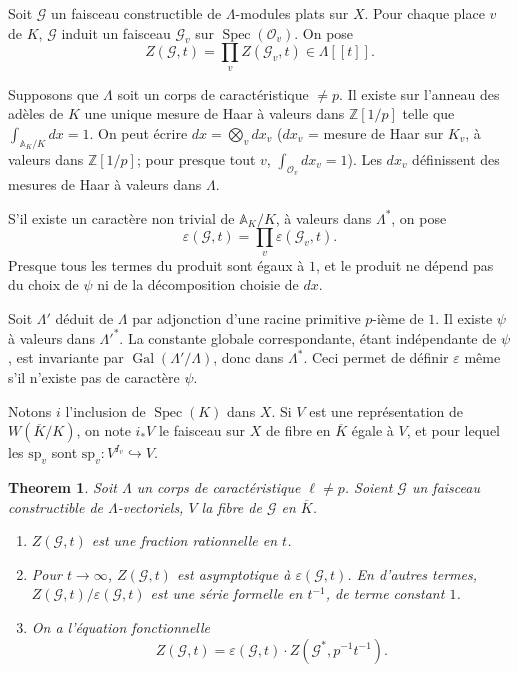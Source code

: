 \documentclass[11pt,a4paper]{amsart}
\theoremstyle{plain}
\newtheorem{theorem}{Theorem}[section]
\theoremstyle{definition}
\DeclareMathOperator{\Gal}{Gal}
\DeclareMathOperator{\Spec}{Spec}
\newcommand{\dbZ}{\mathbb{Z}}
\newcommand{\dbA}{\mathbb{A}}
\newenvironment{para}{\par\noindent}{\par}
\newcommand{\scrO}{\mathscr{O}}
\newcommand{\ov}[1]{\overline{#1}}
\newcommand{\eps}{\varepsilon}
\begin{document}
\begin{para}
Soit $\mathscr{G}$ un faisceau constructible de $\Lambda$-modules plats sur $X$. Pour chaque place $v$ de $K$, $\mathscr{G}$ induit un faisceau $\mathscr{G}_{v}$ sur $\Spec(\scrO_{v})$. On pose
\begin{equation}
Z(\mathscr{G},t) = \prod_{v} Z(\mathscr{G}_{v},t) \in \Lambda[[t]].
\end{equation}
\end{para}

\begin{para}
Supposons que $\Lambda$ soit un corps de caract\'eristique $\not= p$. Il existe sur l'anneau des ad\`eles de $K$ une unique mesure de Haar \`a valeurs dans $\dbZ[1/p]$ telle que $\int_{\dbA_{K}/K} dx = 1$. On peut \'ecrire $dx = \bigotimes_{v} dx_{v}$ ($dx_{v}$ = mesure de Haar sur $K_{v}$, \`a valeurs dans $\dbZ[1/p]$; pour presque tout $v$, $\int_{\scrO_{v}} dx_{v} = 1$). Les $dx_{v}$ d\'efinissent des mesures de Haar \`a valeurs dans $\Lambda$.

S'il existe un caract\`ere non trivial de $\dbA_{K}/K$, \`a valeurs dans $\Lambda^{*}$, on pose
\begin{equation}
\eps(\mathscr{G},t) = \prod_{v} \eps(\mathscr{G}_{v}, t).
\end{equation}
Presque tous les termes du produit sont \'egaux \`a $1$, et le produit ne d\'epend pas du choix de $\psi$ ni de la d\'ecomposition choisie de $dx$.

Soit $\Lambda'$ d\'eduit de $\Lambda$ par adjonction d'une racine primitive $p$-i\`eme de $1$. Il existe $\psi$ \`a valeurs dans $\Lambda'^{*}$. La constante globale correspondante, \'etant ind\'ependante de $\psi$, est invariante par $\Gal(\Lambda'/\Lambda)$, donc dans $\Lambda^{*}$. Ceci permet de d\'efinir $\eps$ m\^eme s'il n'existe pas de caract\`ere $\psi$.
\end{para}

\begin{para}
Notons $i$ l'inclusion de $\Spec(K)$ dans $X$. Si $V$ est une repr\'esentation de $W(\ov{K}/K)$, on note $i_{*}V$ le faisceau sur $X$ de fibre en $\ov{K}$ \'egale \`a $V$, et pour lequel les $\text{sp}_{v}$ sont $\text{sp}_{v}: V^{I_{v}} \hookrightarrow V$.
\end{para}

\begin{theorem}\label{thm7.11}
Soit $\Lambda$ un corps de caract\'eristique $\ell \not= p$. Soient $\mathscr{G}$ un faisceau constructible de $\Lambda$-vectoriels, $V$ la fibre de $\mathscr{G}$ en $\ov{K}$.
\begin{enumerate}
\item[\rm(i)] $Z(\mathscr{G},t)$ est une fraction rationnelle en $t$.
\item[\rm(ii)] Pour $t \to \infty$, $Z(\mathscr{G},t)$ est asymptotique \`a $\eps(\mathscr{G},t)$. En d'autres termes, $Z(\mathscr{G},t)/\eps(\mathscr{G},t)$ est une s\'erie formelle en $t^{-1}$, de terme constant $1$.
\item[\rm(iii)] On a l'\'equation fonctionnelle
\[
Z(\mathscr{G},t) = \eps(\mathscr{G},t) \cdot Z(\mathscr{G}^{*}, p^{-1}t^{-1}).
\]
\end{enumerate}
\end{theorem}
\end{document}
